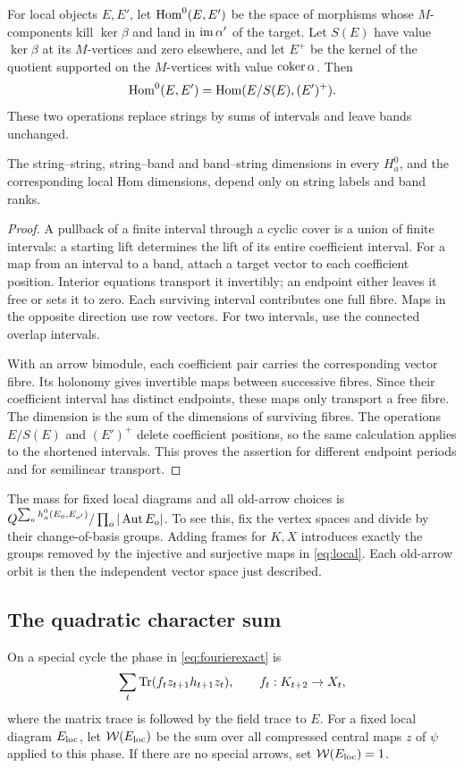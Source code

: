 For local objects $E,E'$, let $\operatorname{Hom}^0(E,E')$ be the space of morphisms whose $M$-components kill $\ker\beta$ and land in $\operatorname{im}\alpha'$ of the target. Let $S(E)$ have value $\ker\beta$ at its $M$-vertices and zero elsewhere, and let $E^+$ be the kernel of the quotient supported on the $M$-vertices with value $\operatorname{coker}\alpha$. Then
\[
 \operatorname{Hom}^0(E,E')=\operatorname{Hom}(E/S(E),(E')^+).
\]
These two operations replace strings by sums of intervals and leave bands unchanged.

\begin{lemma}\label{lem:mixedhom}
The string--string, string--band and band--string dimensions in every $H_a^0$, and the corresponding local Hom dimensions, depend only on string labels and band ranks.
\end{lemma}
\begin{proof}
A pullback of a finite interval through a cyclic cover is a union of finite intervals: a starting lift determines the lift of its entire coefficient interval. For a map from an interval to a band, attach a target vector to each coefficient position. Interior equations transport it invertibly; an endpoint either leaves it free or sets it to zero. Each surviving interval contributes one full fibre. Maps in the opposite direction use row vectors. For two intervals, use the connected overlap intervals.

With an arrow bimodule, each coefficient pair carries the corresponding vector fibre. Its holonomy gives invertible maps between successive fibres. Since their coefficient interval has distinct endpoints, these maps only transport a free fibre. The dimension is the sum of the dimensions of surviving fibres. The operations $E/S(E)$ and $(E')^+$ delete coefficient positions, so the same calculation applies to the shortened intervals. This proves the assertion for different endpoint periods and for semilinear transport.
\end{proof}

The mass for fixed local diagrams and all old-arrow choices is
$Q^{\sum_a h_a^0(E_o,E_{o'})}/\prod_o|\operatorname{Aut} E_o|$.
To see this, fix the vertex spaces and divide by their change-of-basis groups. Adding frames for $K,X$ introduces exactly the groups removed by the injective and surjective maps in \eqref{eq:local}. Each old-arrow orbit is then the independent vector space just described.

\subsection{The quadratic character sum}
On a special cycle the phase in \eqref{eq:fourierexact} is
\begin{equation}\label{eq:phase}
 \sum_t\operatorname{Tr}(f_tz_{t+1}h_{t+1}z_t),\qquad f_t:K_{t+2}\to X_t,
\end{equation}
where the matrix trace is followed by the field trace to $E$. For a fixed local diagram $E_{\rm loc}$, let $\mathcal W(E_{\rm loc})$ be the sum over all compressed central maps $z$ of $\psi$ applied to this phase. If there are no special arrows, set $\mathcal W(E_{\rm loc})=1$.

